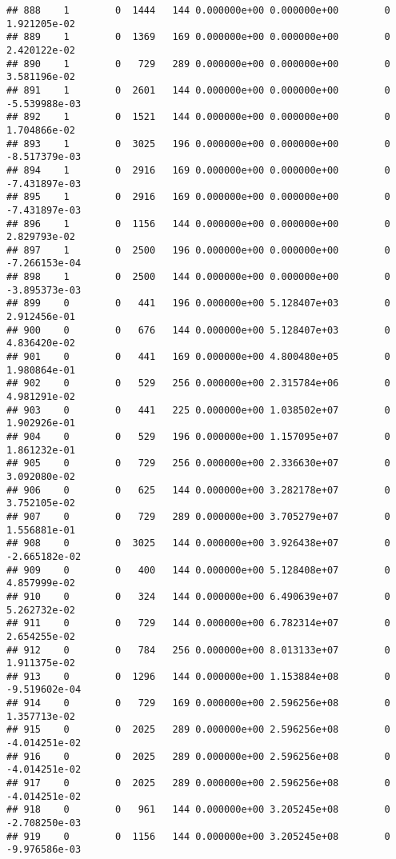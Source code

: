\documentclass[
]{article}
\begin{document}
\begin{enumerate}
\begin{verbatim}
## 888    1        0  1444   144 0.000000e+00 0.000000e+00        0  1.921205e-02
## 889    1        0  1369   169 0.000000e+00 0.000000e+00        0  2.420122e-02
## 890    1        0   729   289 0.000000e+00 0.000000e+00        0  3.581196e-02
## 891    1        0  2601   144 0.000000e+00 0.000000e+00        0 -5.539988e-03
## 892    1        0  1521   144 0.000000e+00 0.000000e+00        0  1.704866e-02
## 893    1        0  3025   196 0.000000e+00 0.000000e+00        0 -8.517379e-03
## 894    1        0  2916   169 0.000000e+00 0.000000e+00        0 -7.431897e-03
## 895    1        0  2916   169 0.000000e+00 0.000000e+00        0 -7.431897e-03
## 896    1        0  1156   144 0.000000e+00 0.000000e+00        0  2.829793e-02
## 897    1        0  2500   196 0.000000e+00 0.000000e+00        0 -7.266153e-04
## 898    1        0  2500   144 0.000000e+00 0.000000e+00        0 -3.895373e-03
## 899    0        0   441   196 0.000000e+00 5.128407e+03        0  2.912456e-01
## 900    0        0   676   144 0.000000e+00 5.128407e+03        0  4.836420e-02
## 901    0        0   441   169 0.000000e+00 4.800480e+05        0  1.980864e-01
## 902    0        0   529   256 0.000000e+00 2.315784e+06        0  4.981291e-02
## 903    0        0   441   225 0.000000e+00 1.038502e+07        0  1.902926e-01
## 904    0        0   529   196 0.000000e+00 1.157095e+07        0  1.861232e-01
## 905    0        0   729   256 0.000000e+00 2.336630e+07        0  3.092080e-02
## 906    0        0   625   144 0.000000e+00 3.282178e+07        0  3.752105e-02
## 907    0        0   729   289 0.000000e+00 3.705279e+07        0  1.556881e-01
## 908    0        0  3025   144 0.000000e+00 3.926438e+07        0 -2.665182e-02
## 909    0        0   400   144 0.000000e+00 5.128408e+07        0  4.857999e-02
## 910    0        0   324   144 0.000000e+00 6.490639e+07        0  5.262732e-02
## 911    0        0   729   144 0.000000e+00 6.782314e+07        0  2.654255e-02
## 912    0        0   784   256 0.000000e+00 8.013133e+07        0  1.911375e-02
## 913    0        0  1296   144 0.000000e+00 1.153884e+08        0 -9.519602e-04
## 914    0        0   729   169 0.000000e+00 2.596256e+08        0  1.357713e-02
## 915    0        0  2025   289 0.000000e+00 2.596256e+08        0 -4.014251e-02
## 916    0        0  2025   289 0.000000e+00 2.596256e+08        0 -4.014251e-02
## 917    0        0  2025   289 0.000000e+00 2.596256e+08        0 -4.014251e-02
## 918    0        0   961   144 0.000000e+00 3.205245e+08        0 -2.708250e-03
## 919    0        0  1156   144 0.000000e+00 3.205245e+08        0 -9.976586e-03

\end{verbatim}
\end{enumerate}
\end{document}
